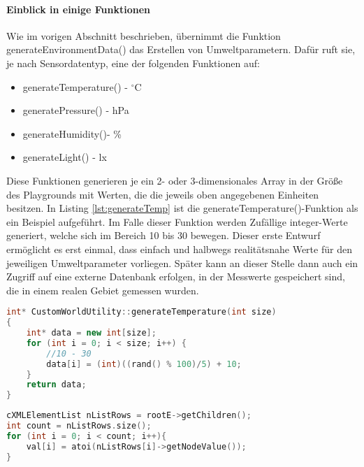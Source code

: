 \paragraph{Einblick in einige Funktionen}

Wie im vorigen Abschnitt beschrieben, übernimmt die Funktion generateEnvironmentData() das Erstellen von Umweltparametern. Dafür ruft sie, je nach Sensordatentyp, eine der folgenden Funktionen auf:

\begin{multicols}{2}
\begin{itemize}
\item generateTemperature() - $^\circ $C
\item generatePressure() - hPa
\item generateHumidity()- \%
\item generateLight() - lx
\end{itemize}
\end{multicols}

Diese Funktionen generieren je ein 2- oder 3-dimensionales Array in der Größe des Playgrounds mit Werten, die die jeweils oben angegebenen Einheiten besitzen. In Listing \ref{lst:generateTemp} ist die generateTemperature()-Funktion als ein Beispiel aufgeführt. Im Falle dieser Funktion werden Zufällige integer-Werte generiert, welche sich im Bereich 10 bis 30 bewegen. Dieser erste Entwurf ermöglicht es erst einmal, dass einfach und halbwegs realitätsnahe Werte für den jeweiligen Umweltparameter vorliegen. Später kann an dieser Stelle dann auch ein Zugriff auf eine externe Datenbank erfolgen, in der Messwerte gespeichert sind, die in einem realen Gebiet gemessen wurden.

\begin{lstlisting}[language=C++, label=lst:generateTemp, caption=generateTemperature()]
int* CustomWorldUtility::generateTemperature(int size)
{
    int* data = new int[size];
    for (int i = 0; i < size; i++) {
        //10 - 30
        data[i] = (int)((rand() % 100)/5) + 10;
    }
    return data;
}
\end{lstlisting}

\begin{lstlisting}[language=C++, label=lst:readXML, caption=Kurzbeschreibung readXML()]
cXMLElementList nListRows = rootE->getChildren();
int count = nListRows.size();
for (int i = 0; i < count; i++){
    val[i] = atoi(nListRows[i]->getNodeValue());
}
\end{lstlisting}

